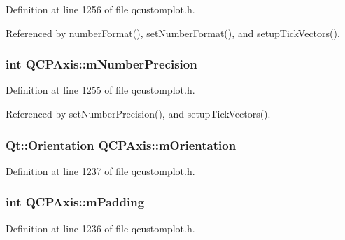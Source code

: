 Definition at line 1256 of file qcustomplot.\+h.



Referenced by number\+Format(), set\+Number\+Format(), and setup\+Tick\+Vectors().

\hypertarget{class_q_c_p_axis_acd76e8c783384d99ccc4a13797eec188}{}
\subsubsection[{m\+Number\+Precision}]{\setlength{\rightskip}{0pt plus 5cm}int Q\+C\+P\+Axis\+::m\+Number\+Precision\hspace{0.3cm}{\ttfamily [protected]}}\label{class_q_c_p_axis_acd76e8c783384d99ccc4a13797eec188}


Definition at line 1255 of file qcustomplot.\+h.



Referenced by set\+Number\+Precision(), and setup\+Tick\+Vectors().

\hypertarget{class_q_c_p_axis_a048e1792fa86f4f86df55200b3f0be36}{}
\subsubsection[{m\+Orientation}]{\setlength{\rightskip}{0pt plus 5cm}Qt\+::\+Orientation Q\+C\+P\+Axis\+::m\+Orientation\hspace{0.3cm}{\ttfamily [protected]}}\label{class_q_c_p_axis_a048e1792fa86f4f86df55200b3f0be36}


Definition at line 1237 of file qcustomplot.\+h.

\hypertarget{class_q_c_p_axis_a52a805a4f03231210e0880db7f77e098}{}
\subsubsection[{m\+Padding}]{\setlength{\rightskip}{0pt plus 5cm}int Q\+C\+P\+Axis\+::m\+Padding\hspace{0.3cm}{\ttfamily [protected]}}\label{class_q_c_p_axis_a52a805a4f03231210e0880db7f77e098}


Definition at line 1236 of file qcustomplot.\+h.



